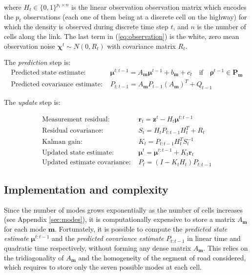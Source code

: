 \documentclass[11pt]{article}
\numberwithin{equation}{section}
\numberwithin{figure}{section}
\numberwithin{table}{section}
\begin{document}
\noindent where $H_{t}\in \{ 0,1 \}^{p_{t}\times n}$ is the linear observation observation matrix which encodes the $p_{t}$ observations (each one of them being at a discrete cell on the highway) for which the density is observed during discrete time step $t$, and $n$ is the number of cells along the link. The last term in (\ref{eq:observation}) is the white, zero mean observation noise $\boldsymbol\chi^{t} \sim N(0,R_{t})$ with covariance matrix $R_{t}$.

\noindent The \textit{prediction} step is:
\begin{equation}
\begin{array}{ll}
\text{Predicted state estimate: } & \boldsymbol\mu^{t:t-1} = A_{\boldsymbol m} \boldsymbol\mu^{t-1} + b_{\boldsymbol m} + c_{t}
\quad\text{if}\quad\boldsymbol\rho^{t-1}\in\textbf{P}_{\boldsymbol m}\\
\text{Predicted covariance estimate: } & P_{t:t-1} = A_{\boldsymbol m}P_{t-1}(A_{\boldsymbol m})^{T} + Q_{t-1}
\end{array}
\label{eq:predict}
\end{equation}

\noindent The \textit{update} step is:

\begin{equation}
\begin{array}{ll}
\text{Measurement residual: } & \boldsymbol r_{t} = \boldsymbol z^{t} - H_{t}\boldsymbol\mu^{t:t-1}\\
\text{Residual covariance: } & S_{t} = H_{t}P_{t:t-1}H_{t}^{T}+R_{t}\\
\text{Kalman gain: } & K_{t} = P_{t:t-1}H_{t}^{T}S_{t}^{-1}\\
\text{Updated state estimate: } & \boldsymbol\mu^{t} = \boldsymbol\mu^{t:t-1} + K_{t} \boldsymbol r_{t}\\
\text{Updated estimate covariance: } & P_{t} = (I - K_{t}H_{t})P_{t:t-1}
\end{array}
\label{eq:update}
\end{equation}

\subsection{Implementation and complexity}

Since the number of modes grows exponentially as the number of cells increases (see Appendix \ref{sec:modes}), it is computationally expensive to store a matrix $A_{\boldsymbol m}$ for each mode $\boldsymbol m$. Fortunately, it is possible to compute the \textit{predicted state estimate} $\boldsymbol\mu^{t:t-1}$ and the \textit{predicted covariance estimate} $P_{t:t-1}$ in linear time and quadratic time respectively, without forming any dense matrix $A_{\boldsymbol m}$. This relies on the tridiagonality of $A_{\boldsymbol m}$ and the homogeneity of the segment of road considered, which requires to store only the seven possible modes at each cell\footnotemark.
\end{document}
